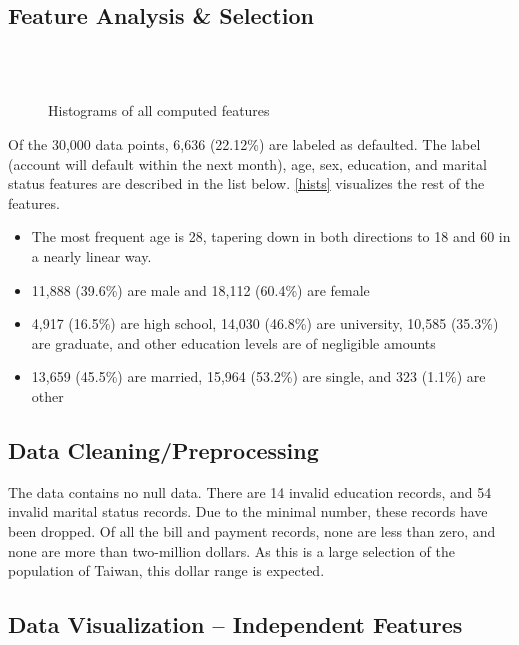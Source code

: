 \documentclass[conference]{IEEEtran}
\begin{document}
\subsection{Feature Analysis \& Selection}

\begin{figure}[ht]
	\\
	\\
	\caption{Histograms of all computed features}
	\label{hists_computed}
\end{figure}

Of the 30,000 data points, 6,636 (22.12\%) are labeled as defaulted. The label
(account will default within the next month), age, sex, education, and marital
status features are described in the list below. \autoref{hists} visualizes the
rest of the features.

\begin{itemize}
	\item The most frequent age is 28, tapering down in both directions to 18 and 60 in a
	      nearly linear way.
	\item 11,888 (39.6\%) are male and 18,112 (60.4\%) are female
	\item 4,917 (16.5\%) are high school, 14,030 (46.8\%) are university, 10,585 (35.3\%) are graduate, and other education levels are of negligible amounts
	\item 13,659 (45.5\%) are married, 15,964 (53.2\%) are single, and 323 (1.1\%) are other
\end{itemize}

\subsection{Data Cleaning/Preprocessing}

The data contains no null data. There are 14 invalid education records, and 54
invalid marital status records. Due to the minimal number, these records have
been dropped. Of all the bill and payment records, none are less than zero, and
none are more than two-million dollars. As this is a large selection of the
population of Taiwan, this dollar range is expected. \clearpage

\subsection{Data Visualization – Independent Features}
\end{document}
